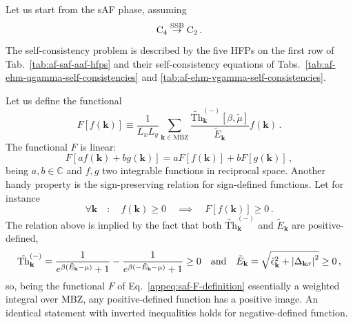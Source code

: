Let us start from the sAF phase, assuming
\[
	\mathrm{C}_4 \stackrel{\mathrm{SSB}}{\to} \mathrm{C}_2 \, .
\]
The self-consistency problem is described by the five HFPs on the first row of Tab.~\ref{tab:af-saf-aaf-hfps} and their self-consistency equations of Tabs.~\ref{tab:af-ehm-ugamma-self-consistencies} and \ref{tab:af-ehm-vgamma-self-consistencies}.

Let us define the functional
\begin{equation}\label{appeq:saf-F-definition}
	F[f(\mathbf{k})] \equiv \frac{1}{L_x L_y} \sum_{\mathbf{k}\in\mathrm{MBZ}} \frac{\tilde{\mathrm{Th}}_\mathbf{k}^{(-)}[\beta,\tilde{\mu}]}{\tilde{E}_\mathbf{k}} f(\mathbf{k}) \, .
\end{equation}
The functional $F$ is linear:
\begin{equation}\label{appeq:saf-F-linearity}
	F[a f(\mathbf{k}) + b g(\mathbf{k})] = a F[f(\mathbf{k})] + b F[g(\mathbf{k})] \, ,
\end{equation}
being $a,b \in \mathbb{C}$ and $f,g$ two integrable functions in reciprocal space. Another handy property is the sign-preserving relation for sign-defined functions. Let for instance
\begin{equation}\label{appeq:saf-F-positivity}
	\forall \mathbf{k} \quad\colon\quad f(\mathbf{k}) \ge 0 
	\quad\implies\quad F[f(\mathbf{k})] \ge 0 \, .
\end{equation}
The relation above is implied by the fact that both $\tilde{\mathrm{Th}}_\mathbf{k}^{(-)}$ and $\tilde{E}_\mathbf{k}$ are positive-defined,
\[
	\tilde{\mathrm{Th}}_\mathbf{k}^{(-)} = \frac{1}{e^{\beta(\tilde{E}_\mathbf{k}-\mu)}+1} - \frac{1}{e^{\beta(-\tilde{E}_\mathbf{k}-\mu)}+1} \ge 0
	\qq{and}
	\tilde{E}_\mathbf{k} = \sqrt{\tilde{\epsilon}_\mathbf{k}^2 + \abs{\Delta_{\mathbf{k}\sigma}}^2} \ge 0 \, ,
\]
so, being the functional $F$ of Eq.~\eqref{appeq:saf-F-definition} essentially a weighted integral over MBZ, any positive-defined function has a positive image. An identical statement with inverted inequalities holds for negative-defined function.

